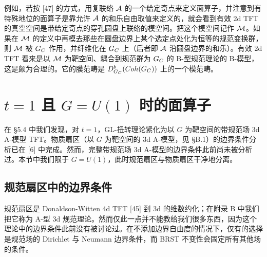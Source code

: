 例如，若按 [47] 的方式，用复联络 $\mathcal{A}$ 的一个给定奇点来定义面算子，并注意到有特殊地位的面算子是靠允许 $\mathcal{A}$ 的和乐自由取值来定义的，就会看到有效 2d TFT 的真空空间是带给定奇点的穿孔圆盘上联络的模空间。把这个模空间记作 $\mathcal{M}$。如果在 $\mathcal{M}$ 的定义中再模去那些在圆盘边界上某个选定点处化为恒等的规范变换群，则 $\mathcal{M}$ 被 $G_C$ 作用，并纤维化在 $G_C$ 上（后者即 $\mathcal{A}$ 沿圆盘边界的和乐）。有效 2d TFT 看来是以 $\mathcal{M}$ 为靶空间、耦合到规范群为 $G_C$ 的 B-型规范理论的 B-模型，这是颇为合理的。它的膜范畴是 $D^b_{G_C}(Coh(G_C))$ 上的一个模范畴。


\section{\texorpdfstring{$t=1$}{t=1} 且 \texorpdfstring{$G=U(1)$}{G=U(1)} 时的面算子}

在 §5.4 中我们发现，对 $t=1$，GL-扭转理论紧化为以 $G$ 为靶空间的带规范场 3d A-模型 TFT。物质扇区（以 $G$ 为靶空间的 3d A-模型，见 §B.1）的边界条件分析已在 [6] 中完成。然而，完整带规范场 3d A-模型的边界条件此前尚未被分析过。本节中我们限于 $G=U(1)$，此时规范扇区与物质扇区干净地分离。



\subsection{规范扇区中的边界条件}

规范扇区是 Donaldson-Witten 4d TFT [45] 到 3d 的维数约化；在附录 B 中我们把它称为 A-型 3d 规范理论。然而仅此一点并不能教给我们很多东西，因为这个理论中的边界条件此前没有被讨论过。在不添加边界自由度的情况下，仅有的选择是规范场的 Dirichlet 与 Neumann 边界条件，而 BRST 不变性会固定所有其他场的条件。

